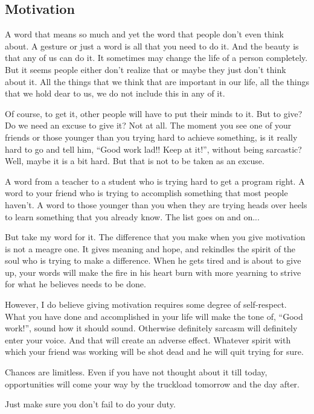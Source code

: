 \documentclass[twoside,11pt,titlepage]{article}
\begin{document}
\newpage
\begin{center}
  \section{Motivation}
\end{center}
\bigskip
\bigskip
\bigskip

A word that means so much and yet the word that people don't even think about. A gesture or just a word is all that you need to do it. And the beauty is that any of us can do it. It sometimes may change the life of a person completely. But it seems people either don't realize that or maybe they just don't think about it. All the things that we think that are important in our life, all the things that we hold dear to us, we do not include this in any of it.

Of course, to get it, other people will have to put their minds to it. But to give? Do we need an excuse to give it? Not at all. The moment you see one of your friends or those younger than you trying hard to achieve something, is it really hard to go and tell him, ``Good work lad!! Keep at it!'', without being sarcastic? Well, maybe it is a bit hard. But that is not to be taken as an excuse.

A word from a teacher to a student who is trying hard to get a program right. A word to your friend who is trying to accomplish something that most people haven't. A word to those younger than you when they are trying heads over heels to learn something that you already know. The list goes on and on...

But take my word for it. The difference that you make when you give motivation is not a meagre one. It gives meaning and hope, and rekindles the spirit of the soul who is trying to make a difference. When he gets tired and is about to give up, your words will make the fire in his heart burn with more yearning to strive for what he believes needs to be done.

However, I do believe giving motivation requires some degree of self-respect. What you have done and accomplished in your life will make the tone of, ``Good work!'', sound how it should sound. Otherwise definitely sarcasm will definitely enter your voice. And that will create an adverse effect. Whatever spirit with which your friend was working will be shot dead and he will quit trying for sure.

Chances are limitless. Even if you have not thought about it till today, opportunities will come your way by the truckload tomorrow and the day after.

Just make sure you don't fail to do your duty.
\end{document}
